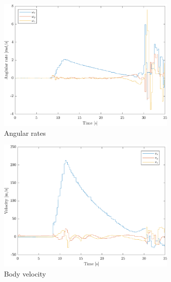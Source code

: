 \begin{figure}[ht]
\begin{subfigure}{0.49\textwidth}
        \includegraphics[width=0.95\textwidth]{images-results/testflight_w.png}
        \caption{Angular rates}
        \label{fig:testflight-w}
    \end{subfigure}
    \begin{subfigure}{0.49\textwidth}
        \includegraphics[width=0.95\textwidth]{images-results/testflight_v.png}
        \caption{Body velocity}
        \label{fig:testflight-v}
    \end{subfigure}
    \begin{subfigure}{0.49\textwidth}

\end{subfigure}
\end{figure}
